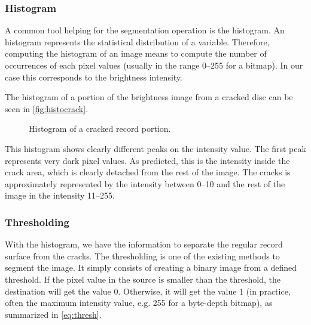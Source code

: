 \subsubsection{Histogram}

A common tool helping for the segmentation operation is the histogram. An histogram represents the statistical distribution of a variable. Therefore, computing the histogram of an image means to compute the number of occurrences of each pixel values (usually in the range \numrange[range-phrase=--]{0}{255} for a bitmap). In our case this corresponds to the brightness intensity.

The histogram of a portion of the brightness image from a cracked disc can be seen in \autoref{fig:histocrack}.

\begin{figure}[!ht]
\centering
{}
\caption{Histogram of a cracked record portion.}
\label{fig:histocrack}
\end{figure}

This histogram shows clearly different peaks on the intensity value. The first peak represents very dark pixel values. As predicted, this is the intensity inside the crack area, which is clearly detached from the rest of the image. The cracks is approximately represented by the intensity between \numrange[range-phrase=--]{0}{10} and the rest of the image in the intensity \numrange[range-phrase=--]{11}{255}.

\subsubsection{Thresholding}

With the histogram, we have the information to separate the regular record surface from the cracks. The thresholding is one of the existing methods to segment the image. It simply consists of creating a binary image from a defined threshold. If the pixel value in the source is smaller than the threshold, the destination will get the value 0. Otherwise, it will get the value 1 (in practice, often the maximum intensity value, e.g. 255 for a byte-depth bitmap), as summarized in \eqref{eq:thresh}.

